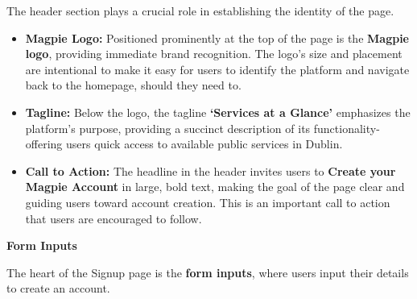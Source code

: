 The header section plays a crucial role in establishing the identity of the
page.
\begin{itemize}
    \item{} \textbf{Magpie Logo:} Positioned prominently at the top of the page
    is the \textbf{Magpie logo}, providing immediate brand recognition. The
    logo's size and placement are intentional to make it easy for users to
    identify the platform and navigate back to the homepage, should they need
    to.
    \item{} \textbf{Tagline:} Below the logo, the tagline \textbf{`Services at a
    Glance'} emphasizes the platform's purpose, providing a succinct description
    of its functionality{-}offering users quick access to available public
    services in Dublin.
    \item{} \textbf{Call to Action:} The headline in the header invites users to
    \textbf{Create your Magpie Account} in large, bold text, making the goal of
    the page clear and guiding users toward account creation. This is an
    important call to action that users are encouraged to follow.
\end{itemize}

\textbf{Form Inputs}

The heart of the Signup page is the \textbf{form inputs}, where users input
their details to create an account.

